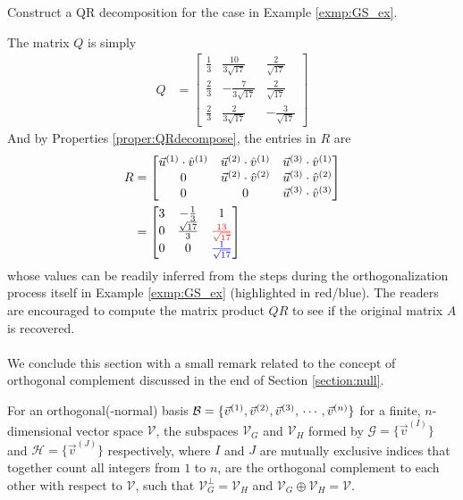 \begin{exmp}
\label{exmp:QRdecom}
Construct a QR decomposition for the case in Example \ref{exmp:GS_ex}.
\end{exmp}
\begin{solution}
The matrix $Q$ is simply
\begin{align*}
Q &= 
\begin{bmatrix}
\frac{1}{3} & \frac{10}{3\sqrt{17}} & \frac{2}{\sqrt{17}} \\
\frac{2}{3} & -\frac{7}{3\sqrt{17}} & \frac{2}{\sqrt{17}} \\
\frac{2}{3} & \frac{2}{3\sqrt{17}} & -\frac{3}{\sqrt{17}}
\end{bmatrix}
\end{align*}
And by Properties \ref{proper:QRdecompose}, the entries in $R$ are
\begin{align*}
R &= 
\begin{bmatrix}
\vec{u}^{(1)} \cdot \hat{v}^{(1)} & \vec{u}^{(2)} \cdot \hat{v}^{(1)} & \vec{u}^{(3)} \cdot \hat{v}^{(1)} \\
0 & \vec{u}^{(2)} \cdot \hat{v}^{(2)} & \vec{u}^{(3)} \cdot \hat{v}^{(2)} \\
0 & 0 & \vec{u}^{(3)} \cdot \hat{v}^{(3)}
\end{bmatrix}  \\
&= 
\begin{bmatrix}
3 & -\frac{1}{3} & 1 \\
0 & \frac{\sqrt{17}}{3} & \textcolor{red}{\frac{13}{\sqrt{17}}}  \\
0 & 0 & \textcolor{blue}{\frac{1}{\sqrt{17}}} \\
\end{bmatrix} 
\end{align*}
whose values can be readily inferred from the steps during the orthogonalization process itself in Example \ref{exmp:GS_ex} (highlighted in red/blue). The readers are encouraged to compute the matrix product $QR$ to see if the original matrix $A$ is recovered.\\
\\
We conclude this section with a small remark related to the concept of orthogonal complement discussed in the end of Section \ref{section:null}.
\begin{proper}
\label{proper:orthodirectsum}
For an orthogonal(-normal) basis $\mathcal{B} = \{\vec{v}^{(1)}, \vec{v}^{(2)}, \vec{v}^{(3)}, \\ \cdots, \vec{v}^{(n)}\}$ for a finite, $n$-dimensional vector space $\mathcal{V}$, the subspaces $\mathcal{V}_G$ and $\mathcal{V}_H$ formed by $\mathcal{G} = \{\vec{v}^{(I)}\}$ and $\mathcal{H} = \{\vec{v}^{(J)}\}$ respectively, where $I$ and $J$ are mutually exclusive indices that together count all integers from $1$ to $n$, are the orthogonal complement to each other with respect to $\mathcal{V}$, such that $\mathcal{V}_G^\perp = \mathcal{V}_H$ and $\mathcal{V}_G \oplus \mathcal{V}_H = \mathcal{V}$.
\end{proper}
\end{solution}

